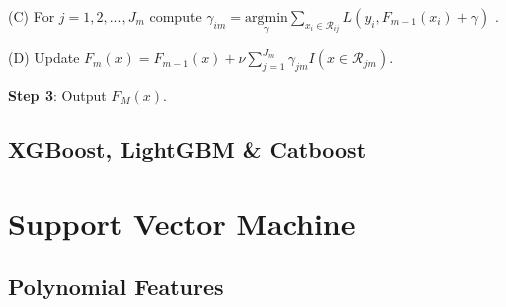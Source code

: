 \documentclass[11pt]{article}
\theoremstyle{definition}
\begin{document}
\quad	(C) For $j = 1, 2, ..., J_m$ compute $\gamma_{im} = \underset{\gamma}{\mathrm{argmin}} \sum_{x_i \in \mathcal{R}_{ij}} L(y_i, F_{m-1}(x_i)+ \gamma )$ . 

\quad	(D) Update $F_m(x) = F_{m-1}(x) + \nu \sum_{j=1}^{J_m} \gamma_{jm} I(x \in \mathcal{R}_{jm})$. 

{\bf{Step 3}}:  Output $F_M(x)$. 


\subsection{XGBoost, LightGBM \& Catboost }












\newpage
\section{Support Vector Machine}



\subsection{Polynomial Features }
\end{document}
